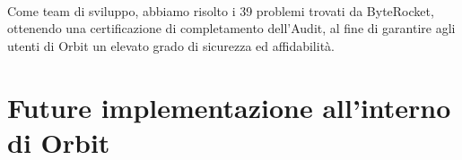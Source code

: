 \documentclass[12pt,a4paper]{report}
\begin{document}
\noindent \\Come team di sviluppo, abbiamo risolto i 39 problemi trovati da ByteRocket, ottenendo una certificazione di completamento dell'Audit, al fine di garantire agli utenti di Orbit un elevato grado di sicurezza ed affidabilità.


\chapter{Future implementazione all'interno di Orbit}




\end{document}
